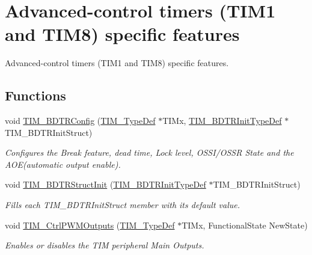 \hypertarget{group___t_i_m___group4}{}\section{Advanced-\/control timers (T\+I\+M1 and T\+I\+M8) specific features}
\label{group___t_i_m___group4}


Advanced-\/control timers (T\+I\+M1 and T\+I\+M8) specific features.  


\subsection*{Functions}
\begin{DoxyCompactItemize}
\item 
void \hyperlink{group___t_i_m___group4_ga3df4ba3f0727f63ce621e2b2e6035d4f}{T\+I\+M\+\_\+\+B\+D\+T\+R\+Config} (\hyperlink{struct_t_i_m___type_def}{T\+I\+M\+\_\+\+Type\+Def} $\ast$T\+I\+Mx, \hyperlink{struct_t_i_m___b_d_t_r_init_type_def}{T\+I\+M\+\_\+\+B\+D\+T\+R\+Init\+Type\+Def} $\ast$T\+I\+M\+\_\+\+B\+D\+T\+R\+Init\+Struct)
\begin{DoxyCompactList}\small\item\em Configures the Break feature, dead time, Lock level, O\+S\+S\+I/\+O\+S\+SR State and the A\+O\+E(automatic output enable). \end{DoxyCompactList}\item 
void \hyperlink{group___t_i_m___group4_gaea0f49938cda8ae0738162194798afc6}{T\+I\+M\+\_\+\+B\+D\+T\+R\+Struct\+Init} (\hyperlink{struct_t_i_m___b_d_t_r_init_type_def}{T\+I\+M\+\_\+\+B\+D\+T\+R\+Init\+Type\+Def} $\ast$T\+I\+M\+\_\+\+B\+D\+T\+R\+Init\+Struct)
\begin{DoxyCompactList}\small\item\em Fills each T\+I\+M\+\_\+\+B\+D\+T\+R\+Init\+Struct member with its default value. \end{DoxyCompactList}\item 
void \hyperlink{group___t_i_m___group4_ga3e59ebced2ab8e0b817c460f1670e97d}{T\+I\+M\+\_\+\+Ctrl\+P\+W\+M\+Outputs} (\hyperlink{struct_t_i_m___type_def}{T\+I\+M\+\_\+\+Type\+Def} $\ast$T\+I\+Mx, Functional\+State New\+State)
\begin{DoxyCompactList}\small\item\em Enables or disables the T\+IM peripheral Main Outputs. \end{DoxyCompactList}\item 

\end{DoxyCompactItemize}
